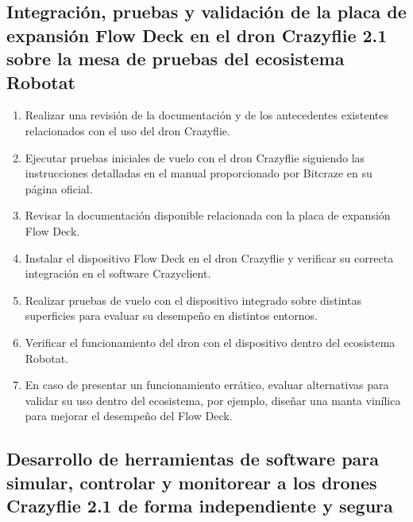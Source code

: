 \subsection*{Integración, pruebas y validación de la placa de expansión Flow Deck en el dron Crazyflie 2.1 sobre la mesa de pruebas del ecosistema Robotat}

\begin{enumerate}
	\item Realizar una revisión de la documentación y de los antecedentes existentes relacionados con el uso del dron Crazyflie.
	\item Ejecutar pruebas iniciales de vuelo con el dron Crazyflie siguiendo las instrucciones detalladas en el manual proporcionado por Bitcraze en su página oficial.
	\item Revisar la documentación disponible relacionada con la placa de expansión Flow Deck.
	\item Instalar el dispositivo Flow Deck en el dron Crazyflie y verificar su correcta integración en el software Crazyclient. 
	\item Realizar pruebas de vuelo con el dispositivo integrado sobre distintas superficies para evaluar su desempeño en distintos entornos.
	\item Verificar el funcionamiento del dron con el dispositivo dentro del ecosistema Robotat.
	\item En caso de presentar un funcionamiento errático, evaluar alternativas para validar su uso dentro del ecosistema, por ejemplo, diseñar una manta vinílica para mejorar el desempeño del Flow Deck.  
\end{enumerate}

\subsection*{Desarrollo de herramientas de software para simular, controlar y monitorear a los drones Crazyflie 2.1 de forma independiente y segura}

